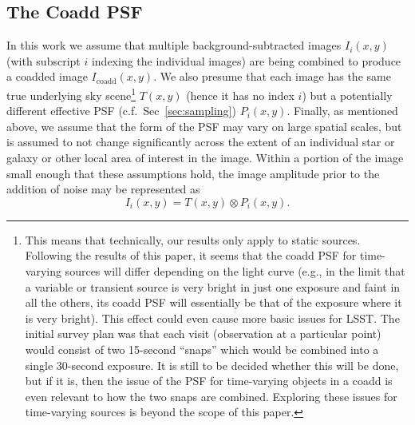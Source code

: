 \documentclass{openjournal}
\newcommand{\irresponse}[1]{{#1}}
\begin{document}
\irresponse{\subsection{The Coadd PSF}}
In this work we assume that multiple background-subtracted images $I_i(x,y)$ (with subscript $i$ indexing the individual images) are being combined to produce a coadded image $I_\text{coadd}(x,y)$.   We also presume that each image has the same true underlying sky scene\footnote{This means that technically, our results only apply to static sources.  Following the results of this paper, it seems that the coadd PSF for time-varying sources will differ depending on the light curve (e.g., in the limit that a variable or transient source is very bright in just one exposure and faint in all the others, its coadd PSF will essentially be that of the exposure where it is very bright). \irresponse{This effect could even cause more basic issues for LSST.  The initial survey plan was that each visit (observation at a particular point) would consist of two 15-second ``snaps'' which would be combined into a single 30-second exposure. It is still to be decided whether this will be done, but if it is, then the issue of the PSF for time-varying objects in a coadd is} even relevant to how the two snaps are combined. Exploring these issues for time-varying sources is beyond the scope of this paper.} $T(x,y)$ (hence it has no index $i$) but a potentially different effective PSF (c.f.\ Sec~\ref{sec:sampling})
$P_i(x,y)$.  Finally, as mentioned above, we assume that the form of the PSF may vary on large spatial scales, but is assumed to not change \irresponse{significantly} across the extent of an individual star or galaxy or other local area of interest in the image.  Within a portion of the image small enough that these assumptions hold, the image amplitude prior to the addition of noise may be represented as
\begin{equation}
I_i(x,y) = T(x,y) \otimes P_i(x,y).
\end{equation}
\end{document}
